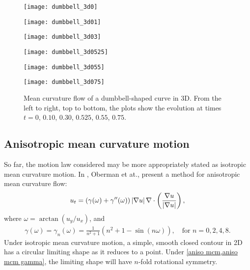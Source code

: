 \begin{figure}[htb!]
        \centering
\begin{minipage}{0.48\textwidth}
        \texttt{[image: dumbbell\_3d0]}
\end{minipage}%
\begin{minipage}{0.48\textwidth}
        \texttt{[image: dumbbell\_3d01]}
\end{minipage}
\begin{minipage}{0.48\textwidth}
        \texttt{[image: dumbbell\_3d03]}
\end{minipage}%
\begin{minipage}{0.48\textwidth}
        \texttt{[image: dumbbell\_3d0525]}
\end{minipage}
\begin{minipage}{0.48\textwidth}
        \texttt{[image: dumbbell\_3d055]}
\end{minipage}%
\begin{minipage}{0.48\textwidth}
        \texttt{[image: dumbbell\_3d075]}
\end{minipage}
\caption[Mean curvature flow of a dumbbell-shaped curve in 3D.]{Mean curvature flow of a dumbbell-shaped curve in 3D. From the left to right, top to bottom, the plots show the evolution at times $t=0$, $0.10$, $0.30$, $0.525$, $0.55$, $0.75$.}
\label{fig:mcm 3d dumbbell}
\end{figure}


\subsection{Anisotropic mean curvature motion}
So far, the motion law considered may be more appropriately stated as isotropic mean curvature motion. In \cite{oberman2011aniso}, Oberman et at., present a method for anisotropic mean curvature flow: 
\begin{align}
        u_t = (\gamma(\omega) + \gamma''(\omega))\left|\nabla u\right| \nabla \cdot \left( \frac{\nabla u}{\left|\nabla u\right|} \right),
\label{aniso mcm}
\end{align}
where $\omega = \arctan(u_y/u_x)$, and 
\begin{align}
        \gamma(\omega) 
= \gamma_n(\omega) 
= \frac{1}{n^2+1}(n^2 + 1 - \sin(n\omega)), 
\quad\text{for } n = 0,2,4,8.
\label{aniso mcm gamma}
\end{align}
Under isotropic mean curvature motion, a simple, smooth closed contour in 2D has a circular limiting shape as it reduces to a point. Under \cref{aniso mcm,aniso mcm gamma}, the limiting shape will have $n$-fold rotational symmetry.


